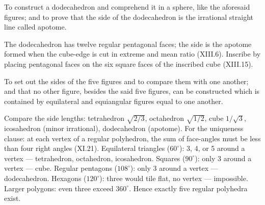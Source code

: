 \begin{claim}
\label{prop:XIII.17}
To construct a dodecahedron and comprehend it in a sphere, like the
aforesaid figures; and to prove that the side of the dodecahedron is
the irrational straight line called apotome.
\end{claim}
\begin{evidence}
\label{ev:XIII.17}
The dodecahedron has twelve regular pentagonal faces; the side is
the apotome formed when the cube-edge is cut in extreme and mean
ratio (XIII.6).  Inscribe by placing pentagonal faces on the six
square faces of the inscribed cube (XIII.15).
\end{evidence}

\begin{claim}
\label{prop:XIII.18}
To set out the sides of the five figures and to compare them with
one another; and that no other figure, besides the said five
figures, can be constructed which is contained by equilateral and
equiangular figures equal to one another.
\end{claim}
\begin{evidence}
\label{ev:XIII.18}
Compare the side lengths: tetrahedron $\sqrt{2/3}$, octahedron
$\sqrt{1/2}$, cube $1/\sqrt{3}$, icosahedron (minor irrational),
dodecahedron (apotome).  For the uniqueness clause: at each vertex of
a regular polyhedron, the sum of face-angles must be less than four
right angles (XI.21).  Equilateral triangles ($60^\circ$): 3, 4, or
5 around a vertex --- tetrahedron, octahedron, icosahedron.  Squares
($90^\circ$): only 3 around a vertex --- cube.  Regular pentagons
($108^\circ$): only 3 around a vertex --- dodecahedron.  Hexagons
($120^\circ$): three would tile flat, no vertex --- impossible.
Larger polygons: even three exceed $360^\circ$.  Hence exactly five
regular polyhedra exist.
\end{evidence}
